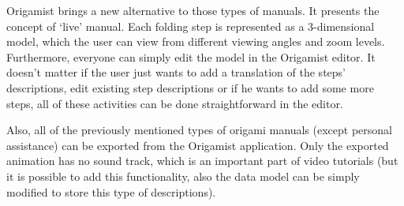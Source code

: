 Origamist brings a new alternative to those types of manuals. It presents the concept of `live' manual. Each folding step is represented as a 3-dimensional model, which the user can view from different viewing angles and zoom levels. Furthermore, everyone can simply edit the model in the Origamist editor. It doesn't matter if the user just wants to add a translation of the steps' descriptions, edit existing step descriptions or if he wants to add some more steps, all of these activities can be done straightforward in the editor.

Also, all of the previously mentioned types of origami manuals (except personal assistance) can be exported from the Origamist application. Only the exported animation has no sound track, which is an important part of video tutorials (but it is possible to add this functionality, also the data model can be simply modified to store this type of descriptions).

